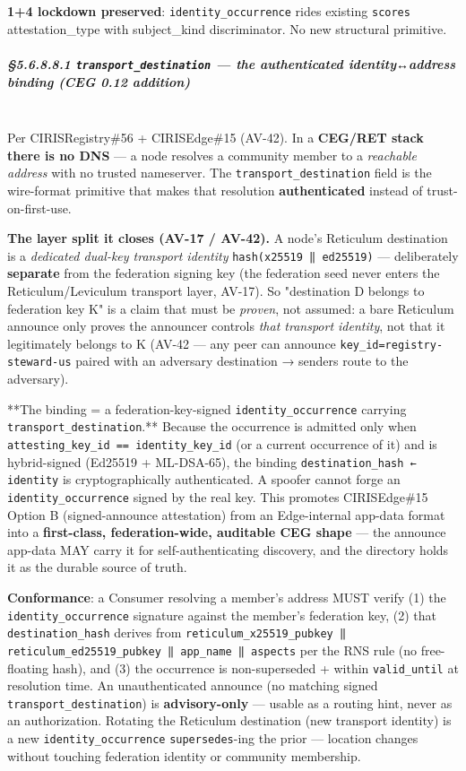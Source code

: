 \documentclass[10pt]{article}
\begin{document}
\textbf{1+4 lockdown preserved}: \texttt{identity\_occurrence} rides existing \texttt{scores} attestation\_type with subject\_kind discriminator. No new structural primitive.


\subparagraph{§5.6.8.8.1 \texttt{transport\_destination} — the authenticated identity↔address binding (CEG 0.12 addition)}\mbox{}\\


Per CIRISRegistry\#56 + CIRISEdge\#15 (AV-42). In a \textbf{CEG/RET stack there is no DNS} — a node resolves a community member to a \textit{reachable address} with no trusted nameserver. The \texttt{transport\_destination} field is the wire-format primitive that makes that resolution \textbf{authenticated} instead of trust-on-first-use.


\textbf{The layer split it closes (AV-17 / AV-42).} A node's Reticulum destination is a \textit{dedicated dual-key transport identity} \texttt{hash(x25519 ‖ ed25519)} — deliberately \textbf{separate} from the federation signing key (the federation seed never enters the Reticulum/Leviculum transport layer, AV-17). So "destination D belongs to federation key K" is a claim that must be \textit{proven}, not assumed: a bare Reticulum announce only proves the announcer controls \textit{that transport identity}, not that it legitimately belongs to K (AV-42 — any peer can announce \texttt{key\_id=registry-steward-us} paired with an adversary destination → senders route to the adversary).


**The binding = a federation-key-signed \texttt{identity\_occurrence} carrying \texttt{transport\_destination}.** Because the occurrence is admitted only when \texttt{attesting\_key\_id == identity\_key\_id} (or a current occurrence of it) and is hybrid-signed (Ed25519 + ML-DSA-65), the binding \texttt{destination\_hash ← identity} is cryptographically authenticated. A spoofer cannot forge an \texttt{identity\_occurrence} signed by the real key. This promotes CIRISEdge\#15 Option B (signed-announce attestation) from an Edge-internal app-data format into a \textbf{first-class, federation-wide, auditable CEG shape} — the announce app-data MAY carry it for self-authenticating discovery, and the directory holds it as the durable source of truth.


\textbf{Conformance}: a Consumer resolving a member's address MUST verify (1) the \texttt{identity\_occurrence} signature against the member's federation key, (2) that \texttt{destination\_hash} derives from \texttt{reticulum\_x25519\_pubkey ‖ reticulum\_ed25519\_pubkey ‖ app\_name ‖ aspects} per the RNS rule (no free-floating hash), and (3) the occurrence is non-superseded + within \texttt{valid\_until} at resolution time. An unauthenticated announce (no matching signed \texttt{transport\_destination}) is \textbf{advisory-only} — usable as a routing hint, never as an authorization. Rotating the Reticulum destination (new transport identity) is a new \texttt{identity\_occurrence} \texttt{supersedes}-ing the prior — location changes without touching federation identity or community membership.
\end{document}
